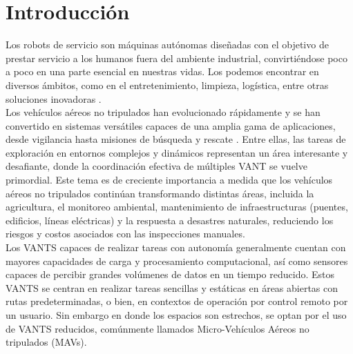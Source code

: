 \documentclass[sigconf]{acmart}
\begin{document}

\maketitle

\section{Introducción}

Los robots de servicio son máquinas autónomas diseñadas con el objetivo de prestar servicio a los humanos fuera del ambiente industrial, convirtiéndose poco a poco en una parte esencial en nuestras vidas. Los podemos encontrar en diversos ámbitos, como en el entretenimiento, limpieza, logística, entre otras soluciones inovadoras \cite{INTEL2023}.\\

Los vehículos aéreos no tripulados han evolucionado rápidamente y se han convertido en sistemas versátiles capaces de una amplia gama de aplicaciones, desde vigilancia hasta misiones de búsqueda y rescate \cite{Schneider2016}. Entre ellas, las tareas de exploración en entornos complejos y dinámicos representan un área interesante y desafiante, donde la coordinación efectiva de múltiples VANT se vuelve primordial. Este tema es de creciente importancia a medida que los vehículos aéreos no tripulados continúan transformando distintas áreas, incluida la agricultura, el monitoreo ambiental, mantenimiento de infraestructuras (puentes, edificios, líneas eléctricas) y la respuesta a desastres naturales, reduciendo los riesgos y costos asociados con las inspecciones manuales.\\

Los VANTS capaces de realizar tareas con autonomía generalmente cuentan con mayores capacidades de carga y procesamiento computacional, así como sensores capaces de percibir grandes volúmenes de datos en un tiempo reducido. Estos VANTS se centran en realizar tareas sencillas y estáticas en áreas abiertas con rutas predeterminadas, o bien, en contextos de operación por control remoto por un usuario. Sin embargo en donde los espacios son estrechos, se optan por el uso de VANTS reducidos, comúnmente llamados Micro-Vehículos Aéreos no tripulados (MAVs).\\%
\end{document}
